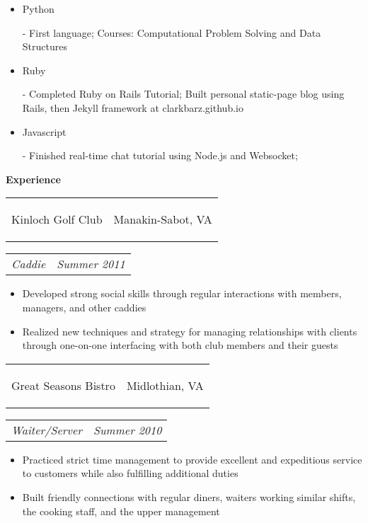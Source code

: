 \documentclass[11pt]{article}
\makeatletter
\newcommand{\headerrow}[2]
{\begin{tabular*}{\linewidth}{l@{\extracolsep{\fill}}r}
	#1 &
	#2 \\
\end{tabular*}}
\makeatother
\begin{document}
\begin{itemize}
	\item \begin{bf}Python\end{bf} - First language; Courses: Computational Problem Solving and Data Structures
	\vspace{-0.5em}
	\item \begin{bf}Ruby\end{bf} - Completed Ruby on Rails Tutorial; Built personal static-page blog using Rails, then Jekyll framework at clarkbarz.github.io
	\vspace{-0.5em}
	\item \begin{bf}Javascript\end{bf} - Finished real-time chat tutorial using Node.js and Websocket; 
\end{itemize}

\vspace{-0.5em}
\begin{LARGE}
	\bf Experience
\end{LARGE}

\vspace{0.5em}

\headerrow
	{\begin{Large}Kinloch Golf Club\end{Large}}
	{Manakin-Sabot, VA}
\headerrow
	{\textit{Caddie}}
	{\textit{Summer 2011}}
	
\vspace{-1.0em}
\begin{itemize}
	\item Developed strong social skills through regular interactions with members, managers, and other caddies
	\vspace{-0.5em}
	\item Realized new techniques and strategy for managing relationships with clients through one-on-one interfacing with both club members and their guests 
\end{itemize}

\vspace{-0.5em}

\headerrow
	{\begin{Large}Great Seasons Bistro\end{Large}}
	{Midlothian, VA}
\headerrow
	{\textit{Waiter/Server}}
	{\textit{Summer 2010}}
	
\vspace{-1.0em}
\begin{itemize}
	\item Practiced strict time management to provide excellent and expeditious service to customers while also fulfilling additional duties
	\vspace{-0.5em}
	\item Built friendly connections with regular diners, waiters working similar shifts, the cooking staff, and the upper management
\end{itemize}
\end{document}
